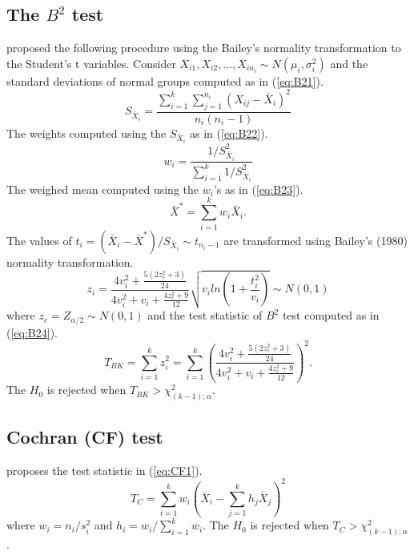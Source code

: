 \subsection{The $B^2$ test}

\cite{ozdemir:2006} proposed the following procedure using the Bailey’s normality transformation to the Student’s t variables. Consider $X_{i1}, X_{i2}, ..., X_{in_i} \sim N(\mu_i, \sigma_i^2)$ and the standard deviations of normal groups computed as in (\ref{eq:B21}).
\begin{equation}
S_{\bar{X}_i}=\frac{\sum_{i=1}^k \sum_{j=1}^{n_i} (X_{ij}-\bar{X}_i)^2}{n_i(n_i-1)} \label{eq:B21}
\end{equation}
The weights computed using the $S_{\bar{X}_i}$ as in (\ref{eq:B22}).
\begin{equation}
w_i=\frac{1/S_{\bar{X}_i}^2}{\sum_{i=1}^k 1/S_{\bar{X}_i}^2} \label{eq:B22}
\end{equation}
The weighed mean computed using the $w_i$'s as in (\ref{eq:B23}).
\begin{equation}
\bar{X}^*=\sum_{i=1}^k w_i\bar{X}_i \label{eq:B23}.
\end{equation}
The values of $t_i=(\bar{X}_i-\bar{X}^*)/S_{\bar{X}_i} \sim t_{n_i-1}$ are transformed using Bailey's (1980) normality transformation.
\begin{equation}
z_i=\frac{4v_i^2+\frac{5(2z_c^2+3)}{24}}{4v_i^2+v_i+\frac{4z_c^2+9}{12}}\sqrt{v_i ln(1+\frac{t_i^2}{v_i})} \sim N(0, 1)
\end{equation}
where $z_c=Z_{\alpha/2} \sim N(0, 1)$ and the test statistic of $B^2$ test computed as in (\ref{eq:B24}).
\begin{equation}
T_{BK}=\sum_{i=1}^k z_i^2=\sum_{i=1}^k (\frac{4v_i^2+\frac{5(2z_c^2+3)}{24}}{4v_i^2+v_i+\frac{4z_c^2+9}{12}})^2 \label{eq:B24}.
\end{equation}
The $H_0$ is rejected when $T_{BK}>\chi^2_{(k-1); \alpha}$.
\subsection{Cochran (CF) test}

\cite{cochran:1937} proposes the test statistic in (\ref{eq:CF1}).
\begin{equation}
T_C=\sum_{i=1}^k w_i (\bar{X}_i - \sum_{j=1}^k h_j\bar{X}_j)^2 \label{eq:CF1}
\end{equation}
where $w_i=n_i/s_i^2$ and $h_i=w_i/\sum_{i=1}^k w_i$. The $H_0$ is rejected when $T_C > \chi^2_{(k-1); \alpha}$.
